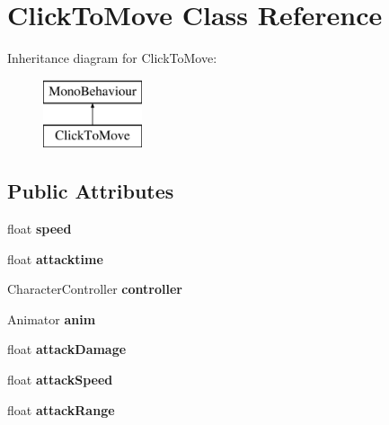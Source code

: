 \hypertarget{class_click_to_move}{}\section{Click\+To\+Move Class Reference}
\label{class_click_to_move}
Inheritance diagram for Click\+To\+Move\+:\begin{figure}[H]
\begin{center}
\leavevmode
\includegraphics[height=2.000000cm]{class_click_to_move}
\end{center}
\end{figure}
\subsection*{Public Attributes}
\begin{DoxyCompactItemize}
\item 
\mbox{\label{class_click_to_move_aac470519ddd58c7abd2483189fad68a1}} 
float {\bfseries speed}
\item 
\mbox{\label{class_click_to_move_ad53ee05cf310c30384135105872ba4ec}} 
float {\bfseries attacktime}
\item 
\mbox{\label{class_click_to_move_a994f7ef477344b83f88a2e3f6cc851d7}} 
Character\+Controller {\bfseries controller}
\item 
\mbox{\label{class_click_to_move_ac94045aa2258a65663f2a808253d5aa5}} 
Animator {\bfseries anim}
\item 
\mbox{\label{class_click_to_move_a8268ad4762bb2f7487c71036e269bde4}} 
float {\bfseries attack\+Damage}
\item 
\mbox{\label{class_click_to_move_ad66cd916848620bfecd80b52c4a9511a}} 
float {\bfseries attack\+Speed}
\item 
\mbox{\label{class_click_to_move_a5f4d06a67a3c86936fe45943e52d6b94}} 
float {\bfseries attack\+Range}
\end{DoxyCompactItemize}
